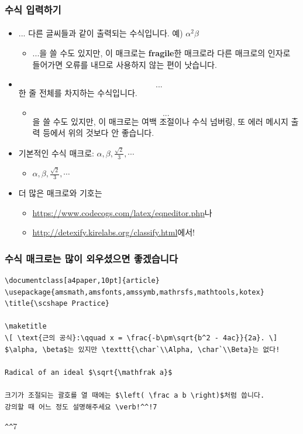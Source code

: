   \begin{frame}[fragile]
    \frametitle{수식 입력하기}
    \framesubtitle{}
    \begin{itemize}
      \item \texttt{$ ... $} 다른 글씨들과 같이 출력되는 수식입니다. 예) $\alpha^2\beta$
      \begin{itemize}
        \item \texttt{\( ... \)}을 쓸 수도 있지만, 이 매크로는 \textbf{fragile}한 매크로라 다른 매크로의 인자로 들어가면 오류를 내므로 사용하지 않는 편이 낫습니다.
      \end{itemize}
      \item \texttt{\[ ... \]} 한 줄 전체를 차지하는 수식입니다.
      \begin{itemize}
        \item \texttt{$$ ... $$}을 쓸 수도 있지만, 이 매크로는 여백 조절이나 수식 넘버링, 또 에러 메시지 출력 등에서 위의 것보다 안 좋습니다.
      \end{itemize}
      \item 기본적인 수식 매크로: \texttt{$ \alpha, \beta, \frac{\sqrt{2}}{3}, \cdots $}
      \begin{itemize}
        \item $ \alpha, \beta, \frac{\sqrt{2}}{3}, \cdots $
      \end{itemize}
      \item 더 많은 매크로와 기호는
      \begin{itemize}
        \item \url{https://www.codecogs.com/latex/eqneditor.php}나 
        \item \url{http://detexify.kirelabs.org/classify.html}에서!
      \end{itemize}
    \end{itemize}
  \end{frame}
  
  \begin{frame}[fragile]
    \frametitle{수식 매크로는 많이 외우셨으면 좋겠습니다}
    \begin{verbatim}
\documentclass[a4paper,10pt]{article}
\usepackage{amsmath,amsfonts,amssymb,mathrsfs,mathtools,kotex}
\title{\scshape Practice}

\maketitle
\[ \text{근의 공식}:\qquad x = \frac{-b\pm\sqrt{b^2 - 4ac}}{2a}. \]
$\alpha, \beta$는 있지만 \texttt{\char`\\Alpha, \char`\\Beta}는 없다!

Radical of an ideal $\sqrt{\mathfrak a}$

크기가 조절되는 괄호를 열 때에는 $\left( \frac a b \right)$처럼 씁니다.
강의할 때 어느 정도 설명해주세요 \verb!^^!7

    \end{verbatim}
    \verb!^^!7
  \end{frame}
  
